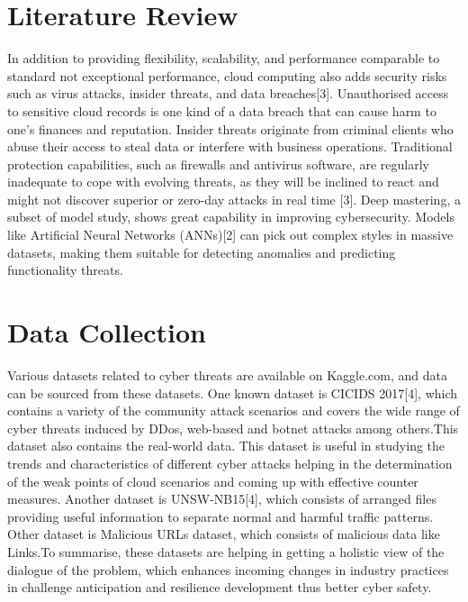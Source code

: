 \documentclass{llncs}
\begin{document}
\section{Literature Review}
In addition to providing flexibility, scalability, and performance comparable to standard not exceptional performance, cloud computing also adds security risks such as virus attacks, insider threats, and data breaches[3]. Unauthorised access to sensitive cloud records is one kind of a data breach that can cause harm to one’s finances and reputation. Insider threats
originate from criminal clients who abuse their access to steal data or interfere with business operations. Traditional protection capabilities, such as firewalls and antivirus software, are regularly inadequate to cope with evolving threats, as they will be inclined to react and might not discover superior or zero-day attacks in real time [3]. Deep mastering,
a subset of model study, shows great capability in improving cybersecurity. Models like Artificial Neural Networks (ANNs)[2] can pick out complex styles in massive datasets, making them suitable for detecting anomalies and predicting functionality threats.


\section{Data Collection}
Various datasets related to cyber threats are available on Kaggle.com, and data can be sourced from these datasets. One known dataset is CICIDS 2017[4], which contains a variety of the community attack scenarios and covers the wide range of cyber threats induced by DDos, web-based and botnet attacks among others.This dataset also contains the real-world data. This dataset is useful in studying the trends and characteristics of different cyber attacks helping in the determination of the weak points of cloud scenarios and coming up with effective counter measures. Another dataset is UNSW-NB15[4], which consists of arranged files providing useful information to separate normal and harmful traffic patterns.
Other dataset is Malicious URLs dataset, which consists of malicious data 
like Links.To summarise, these datasets are helping in getting a holistic view of the dialogue of the problem, which enhances incoming changes in industry practices in challenge anticipation and resilience development thus better cyber safety.
\end{document}

